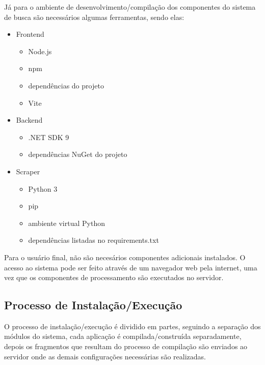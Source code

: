 Já para o ambiente de desenvolvimento/compilação dos componentes do sistema de busca são necessários algumas ferramentas, sendo elas:

\begin{itemize}
    \item Frontend
        \begin{itemize}
            \item Node.js
            \item npm
            \item dependências do projeto
            \item Vite
        \end{itemize}
\end{itemize}

\begin{itemize}
    \item Backend
        \begin{itemize}
            \item .NET SDK 9
            \item dependências NuGet do projeto
        \end{itemize}
\end{itemize}

\begin{itemize}
    \item Scraper
        \begin{itemize}
            \item Python 3
            \item pip
            \item ambiente virtual Python
            \item dependências listadas no requirements.txt
        \end{itemize}
\end{itemize}

Para o usuário final, não são necesários componentes adicionais instalados. O acesso ao sistema pode ser feito através de um navegador web pela internet, uma vez que os componentes de processamento são executados no servidor.


\subsection{Processo de Instalação/Execução}

O processo de instalação/execução é dividido em partes, seguindo a separação dos módulos do sistema, cada aplicação é compilada/construída separadamente, depois os fragmentos que resultam do processo de compilação são enviados ao servidor onde as demais configurações necessárias são realizadas.

